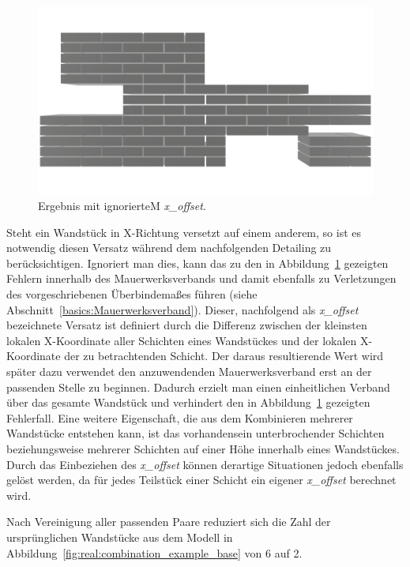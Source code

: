 \begin{figure}[hb!]
  \centering
  \includegraphics[width=0.8\columnwidth]{fig/Real_Combination_Output_No_XOffsetpng.png}
  \caption{Ergebnis mit ignorierteM \textit{x\_offset}.}
  \label{fig:real:combination_example_solution_no_xoffset}
\end{figure}

Steht ein Wandstück in X-Richtung versetzt auf einem anderem, so ist es notwendig diesen Versatz während dem nachfolgenden Detailing zu berücksichtigen.
Ignoriert man dies, kann das zu den in Abbildung~\ref{fig:real:combination_example_solution_no_xoffset} gezeigten Fehlern innerhalb des Mauerwerksverbands und damit ebenfalls zu Verletzungen des vorgeschriebenen Überbindemaßes führen (siehe Abschnitt~\ref*{basics:Mauerwerksverband}).
Dieser, nachfolgend als \textit{x\_offset} bezeichnete Versatz ist definiert durch die Differenz zwischen der kleinsten lokalen X-Koordinate aller Schichten eines Wandstückes und der lokalen X-Koordinate der zu betrachtenden Schicht.
Der daraus resultierende Wert wird später dazu verwendet den anzuwendenden Mauerwerksverband erst an der passenden Stelle zu beginnen.
Dadurch erzielt man einen einheitlichen Verband über das gesamte Wandstück und verhindert den in Abbildung~\ref{fig:real:combination_example_solution_no_xoffset} gezeigten Fehlerfall.
Eine weitere Eigenschaft, die aus dem Kombinieren mehrerer Wandstücke entstehen kann, ist das vorhandensein unterbrochender Schichten beziehungsweise mehrerer Schichten auf einer Höhe innerhalb eines Wandstückes.
Durch das Einbeziehen des \textit{x\_offset} können derartige Situationen jedoch ebenfalls gelöst werden, da für jedes Teilstück einer Schicht ein eigener \textit{x\_offset} berechnet wird.

Nach Vereinigung aller passenden Paare reduziert sich die Zahl der ursprünglichen Wandstücke aus dem Modell in Abbildung~\ref{fig:real:combination_example_base} von 6 auf 2.

